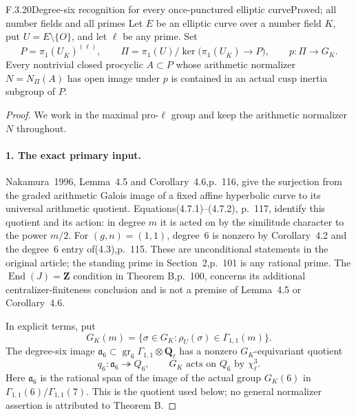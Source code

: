 \begin{result}{F.3.20}{Degree-six recognition for every once-punctured elliptic curve}{Proved; all number fields and all primes}
Let $E$ be an elliptic curve over a number field $K$, put
$U=E\setminus\{O\}$, and let $\ell$ be any prime. Set
\[
 P=\pi_1(U_{\overline K})^{(\ell)},\qquad
 \Pi=\pi_1(U)/\ker\bigl(\pi_1(U_{\overline K})\to P\bigr),
 \qquad p:\Pi\to G_K.
\]
Every nontrivial closed procyclic $A\subset P$ whose arithmetic
normalizer $N=N_\Pi(A)$ has open image under $p$ is contained in an
actual cusp inertia subgroup of $P$.
\end{result}
\begin{proof}
We work in the maximal pro-$\ell$ group and keep the arithmetic normalizer $N$ throughout.

\paragraph{1. The exact primary input.}

Nakamura~1996, Lemma~4.5 and Corollary~4.6,p.~116, give the surjection
from the graded arithmetic Galois image of a fixed affine hyperbolic
curve to its universal arithmetic quotient. Equations(4.7.1)--(4.7.2),
p.~117, identify this quotient and its action\cite[pp.~115--117]{AuditNakamura1996}: in degree $m$ it is acted
on by the similitude character to the power $m/2$. For $(g,n)=(1,1)$,
degree~6 is nonzero by Corollary~4.2 and the degree~6 entry of(4.3),p.~115.
These are unconditional statements in the original article; the
standing prime in Section~2,p.~101 is any rational prime\cite[p.~101]{AuditNakamura1996}. The
$\operatorname{End}(J)=\mathbf Z$ condition in Theorem B,p.~100,
concerns its additional centralizer-finiteness conclusion and is not
a premise of Lemma~4.5 or Corollary~4.6.

In explicit terms, put
\[
 G_K(m)=\{\sigma\in G_K:\rho_U(\sigma)\in\Gamma_{1,1}(m)\}.
\]
The degree-six image $\mathfrak a_6\subset
\operatorname{gr}_6\Gamma_{1,1}\otimes\mathbf Q_\ell$ has a nonzero
$G_K$-equivariant quotient
\[
 q_6:\mathfrak a_6\twoheadrightarrow Q_6,
 \qquad G_K\text{ acts on }Q_6\text{ by }\chi_\ell^3.
\]
Here $\mathfrak a_6$ is the rational span of the image of the actual
group $G_K(6)$ in $\Gamma_{1,1}(6)/\Gamma_{1,1}(7)$.
This is the quotient used below; no general normalizer assertion is
attributed to Theorem B.


\end{proof}
